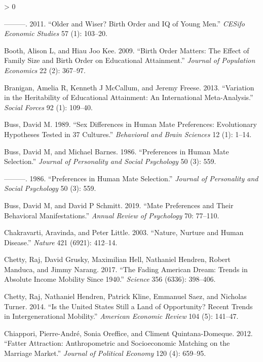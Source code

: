 \documentclass[
]{article}
\newlength{\cslhangindent}
\newenvironment{CSLReferences}[2] %
 {%
  \setlength{\parindent}{0pt}
  \ifodd #1 \everypar{\setlength{\hangindent}{\cslhangindent}}\ignorespaces\fi
  \ifnum #2 > 0
  \setlength{\parskip}{#2\baselineskip}
  \fi
 }%
 {}
\begin{document}
\begin{CSLReferences}{1}{0}
\leavevmode\hypertarget{ref-black2011older}{}%
---------. 2011. {``Older and Wiser? Birth Order and IQ of Young Men.''} \emph{CESifo Economic Studies} 57 (1): 103--20.

\leavevmode\hypertarget{ref-booth2009birth}{}%
Booth, Alison L, and Hiau Joo Kee. 2009. {``Birth Order Matters: The Effect of Family Size and Birth Order on Educational Attainment.''} \emph{Journal of Population Economics} 22 (2): 367--97.

\leavevmode\hypertarget{ref-branigan2013variation}{}%
Branigan, Amelia R, Kenneth J McCallum, and Jeremy Freese. 2013. {``Variation in the Heritability of Educational Attainment: An International Meta-Analysis.''} \emph{Social Forces} 92 (1): 109--40.

\leavevmode\hypertarget{ref-buss1989sex}{}%
Buss, David M. 1989. {``Sex Differences in Human Mate Preferences: Evolutionary Hypotheses Tested in 37 Cultures.''} \emph{Behavioral and Brain Sciences} 12 (1): 1--14.

\leavevmode\hypertarget{ref-buss1986preferences}{}%
Buss, David M, and Michael Barnes. 1986. {``Preferences in Human Mate Selection.''} \emph{Journal of Personality and Social Psychology} 50 (3): 559.

\leavevmode\hypertarget{ref-buss1986preferences}{}%
---------. 1986. {``Preferences in Human Mate Selection.''} \emph{Journal of Personality and Social Psychology} 50 (3): 559.

\leavevmode\hypertarget{ref-buss2019mate}{}%
Buss, David M, and David P Schmitt. 2019. {``Mate Preferences and Their Behavioral Manifestations.''} \emph{Annual Review of Psychology} 70: 77--110.

\leavevmode\hypertarget{ref-chakravarti2003nature}{}%
Chakravarti, Aravinda, and Peter Little. 2003. {``Nature, Nurture and Human Disease.''} \emph{Nature} 421 (6921): 412--14.

\leavevmode\hypertarget{ref-chetty2017fading}{}%
Chetty, Raj, David Grusky, Maximilian Hell, Nathaniel Hendren, Robert Manduca, and Jimmy Narang. 2017. {``The Fading American Dream: Trends in Absolute Income Mobility Since 1940.''} \emph{Science} 356 (6336): 398--406.

\leavevmode\hypertarget{ref-chetty2014united}{}%
Chetty, Raj, Nathaniel Hendren, Patrick Kline, Emmanuel Saez, and Nicholas Turner. 2014. {``Is the United States Still a Land of Opportunity? Recent Trends in Intergenerational Mobility.''} \emph{American Economic Review} 104 (5): 141--47.

\leavevmode\hypertarget{ref-chiappori2012fatter}{}%
Chiappori, Pierre-André, Sonia Oreffice, and Climent Quintana-Domeque. 2012. {``Fatter Attraction: Anthropometric and Socioeconomic Matching on the Marriage Market.''} \emph{Journal of Political Economy} 120 (4): 659--95.


\end{CSLReferences}
\end{document}
